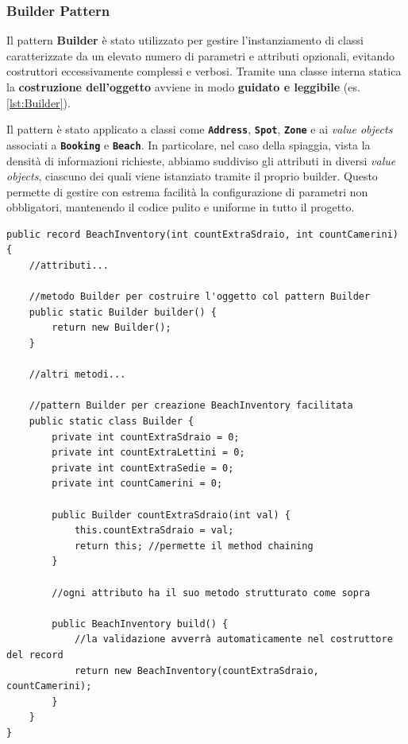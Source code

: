 \documentclass[a4paper,11pt]{article}
\begin{document}

\subsubsection{Builder Pattern}
Il pattern \textbf{Builder} è stato utilizzato per gestire l'instanziamento di classi caratterizzate da un elevato numero di parametri e attributi opzionali, evitando costruttori eccessivamente complessi e verbosi. Tramite una classe interna statica la \textbf{costruzione dell'oggetto} avviene in modo \textbf{guidato e leggibile} (es. \autoref{lst:Builder}).

Il pattern è stato applicato a classi come \textbf{\texttt{Address}}, \textbf{\texttt{Spot}}, \textbf{\texttt{Zone}} e ai \textit{value objects} associati a \textbf{\texttt{Booking}} e \textbf{\texttt{Beach}}. In particolare, nel caso della spiaggia, vista la densità di informazioni richieste, abbiamo suddiviso gli attributi in diversi \textit{value objects}, ciascuno dei quali viene istanziato tramite il proprio builder. Questo permette di gestire con estrema facilità la configurazione di parametri non obbligatori, mantenendo il codice pulito e uniforme in tutto il progetto.
 
\begin{lstlisting}[caption={Implementazione del pattern Builder su un Value Object}, label={lst:Builder}]
public record BeachInventory(int countExtraSdraio, int countCamerini) {
	//attributi...
	
	//metodo Builder per costruire l'oggetto col pattern Builder
	public static Builder builder() {
		return new Builder();
	}
		
	//altri metodi...
	
	//pattern Builder per creazione BeachInventory facilitata
	public static class Builder {
		private int countExtraSdraio = 0;
		private int countExtraLettini = 0;
		private int countExtraSedie = 0;
		private int countCamerini = 0;
		
		public Builder countExtraSdraio(int val) {
			this.countExtraSdraio = val;
			return this; //permette il method chaining
		}
		        
		//ogni attributo ha il suo metodo strutturato come sopra
		
		public BeachInventory build() {
			//la validazione avverrà automaticamente nel costruttore del record
			return new BeachInventory(countExtraSdraio, countCamerini);
		}
	}
}
\end{lstlisting}
\end{document}

